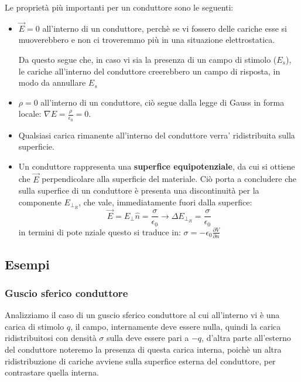 \documentclass{book}
\begin{document}
Le proprietà più importanti per un conduttore sono le seguenti:
\begin{itemize}
  \item $\vec{E}=0$ all'interno di un conduttore, perchè se vi fossero delle cariche esse si muoverebbero e non ci troveremmo più in una situazione elettrostatica.
  
  Da questo segue che, in caso vi sia la presenza di un campo di stimolo ($E_s$), le cariche all'interno del conduttore creerebbero un campo di risposta, in modo da 
  annullare $E_s$
  \item $\rho=0$ all'interno di un conduttore, ciò segue dalla legge di Gauss in forma locale: $\nabla E = \frac{\rho}{\epsilon_0}=0$.
  \item Qualsiasi carica rimanente all'interno del conduttore verra' ridistribuita sulla superficie.
  \item Un conduttore rappresenta una \textbf{superfice equipotenziale}, da cui si ottiene che $\vec{E}$ perpendicolare alla superficie del materiale.
  Ciò porta a concludere che sulla superfice di un conduttore è presenta una discontinuità per la componente $E_{\perp_R}$, che vale, immediatamente fuori dalla superfice:
  \[
  \vec{E}= E_{\perp}\hat{n}=\frac{\sigma}{\epsilon_0} \rightarrow \Delta E_{\perp_R} = \frac{\sigma}{\epsilon_0}
  \]
  in termini di pote nziale questo si traduce in: $\sigma = -\epsilon_0 \frac{\partial V}{\partial n}$
\end{itemize}

\subsection{Esempi}
\subsubsection{Guscio sferico conduttore}
Analizziamo il caso di un guscio sferico conduttore al cui all'interno vi è una carica di stimolo $q$, il campo, internamente deve essere nulla, quindi
la carica ridistribuitosi con densità $\sigma$ sulla deve essere pari a $-q$, d'altra parte all'esterno del conduttore noteremo la presenza di questa carica interna,
poichè un altra ridistribuzione di cariche avviene sulla superfice esterna del conduttore, per contrastare quella interna. 
\end{document}
